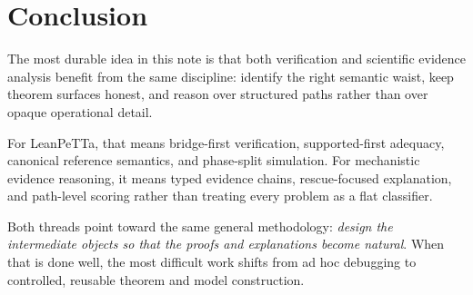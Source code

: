 \documentclass[11pt]{article}
\newcommand{\term}[1]{\emph{#1}}
\begin{document}
\section{Conclusion}

The most durable idea in this note is that both verification and scientific evidence analysis benefit from the same discipline: identify the right semantic waist, keep theorem surfaces honest, and reason over structured paths rather than over opaque operational detail.

For LeanPeTTa, that means bridge-first verification, supported-first adequacy, canonical reference semantics, and phase-split simulation. For mechanistic evidence reasoning, it means typed evidence chains, rescue-focused explanation, and path-level scoring rather than treating every problem as a flat classifier.

Both threads point toward the same general methodology: \term{design the intermediate objects so that the proofs and explanations become natural}. When that is done well, the most difficult work shifts from ad hoc debugging to controlled, reusable theorem and model construction.
\end{document}
